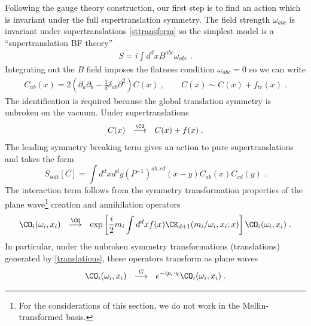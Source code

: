 \documentclass[11pt]{article}
\def\d{{\delta}}
\def\o{{\omega}}
\def\p{{\partial}}
\begin{document}
Following the gauge theory construction, our first step is to find an action which is invariant under the full supertranslation symmetry. The field strength $\o_{abc}$ is invariant under supertranslations \eqref{sttransform} so the simplest model is a ``supertranslation BF theory''
\begin{equation}
\begin{split}
S = i \int d^d x B^{abc} \o_{abc} \; . 
\end{split}
\end{equation}
Integrating out the $B$ field imposes the flatness condition $\o_{abc} = 0 $ so we can write
\begin{equation}
\begin{split}\label{Cidentification-gr}
C_{ab}(x) = 2 \left( \p_a \p_b - \frac{1}{d} \d_{ab} \p^2 \right) C(x) \; , \qquad C(x) \sim C(x) + f_{tr}(x) \; .
\end{split}
\end{equation}
The identification is required because the global translation symmetry is unbroken on the vacuum. Under supertranslations
\begin{equation}
\begin{split}\label{Csupertranslation}
C(x) ~~ \stackrel{\CG}{\longrightarrow} ~~  C(x) + f(x) \;  . 
\end{split}
\end{equation}
The leading  symmetry breaking term gives an action to pure supertranslations and takes the form
\begin{equation}
S_{\text{soft}}[C] =  \int d^d x d^d y ( P^{-1} )^{ab,cd} ( x - y ) C_{ab}(x) C_{cd} ( y ) \; .
\end{equation}
The interaction term follows from the symmetry transformation properties of the plane wave\footnote{For the considerations of this section, we do not work in the Mellin-transformed basis. } creation and annihilation operators \cite{Campiglia:2015kxa}
\begin{equation}
\begin{split}
\CO_i ( \o_i , x_i ) ~~ \stackrel{\CG}{\longrightarrow}~~ \exp \left[ \frac{i}{2} m_i \int d^d x f(x) \CK_{d+1} ( m_i / \o_i , x_i ; x ) \right] \CO_i ( \o_i , x_i ) \; .
\end{split}
\end{equation}
In particular, under the unbroken symmetry transformations (translations) generated by \eqref{translations}, these operators transform as  plane waves
\begin{equation}
\begin{split}
\CO_i ( \o_i , x_i )  ~~ \stackrel{G}{\longrightarrow} ~~  e^{ - i p_i \cdot \chi } \CO_i ( \o_i , x_i ) \; .
\end{split}
\end{equation}
\end{document}

